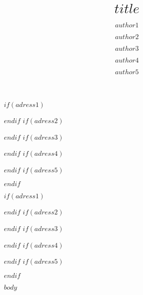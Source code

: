 \documentclass[unnumsec,webpdf,contemporary,large]{oup-authoring-template}%
\theoremstyle{thmstyleone}%
\theoremstyle{thmstyletwo}%
\theoremstyle{thmstylethree}%
\begin{document}



\title[$subtitle$]{$title$}

$if(adress1)$\author[1]{$author1$}$endif$
$if(adress2)$\author[2]{$author2$}$endif$
$if(adress3)$\author[3]{$author3$}$endif$
$if(adress4)$\author[4]{$author4$}$endif$
$if(adress5)$\author[5]{$author5$}$endif$


$if(adress1)$\address[1]{$adress1$}$endif$
$if(adress2)$\address[2]{$adress2$}$endif$
$if(adress3)$\address[3]{$adress3$}$endif$
$if(adress4)$\address[4]{$adress4$}$endif$
$if(adress5)$\address[5]{$adress5$}$endif$







\maketitle


$body$



\end{document}
